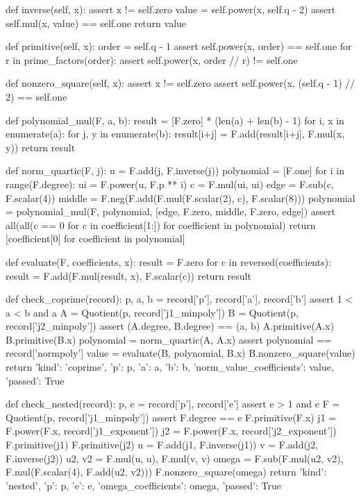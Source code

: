 \documentclass[11pt,a4paper]{article}
\begin{document}
\begin{CompleteProgram}
    def inverse(self, x):
        assert x != self.zero
        value = self.power(x, self.q - 2)
        assert self.mul(x, value) == self.one
        return value

    def primitive(self, x):
        order = self.q - 1
        assert self.power(x, order) == self.one
        for r in prime_factors(order):
            assert self.power(x, order // r) != self.one

    def nonzero_square(self, x):
        assert x != self.zero
        assert self.power(x, (self.q - 1) // 2) == self.one


def polynomial_mul(F, a, b):
    result = [F.zero] * (len(a) + len(b) - 1)
    for i, x in enumerate(a):
        for j, y in enumerate(b):
            result[i+j] = F.add(result[i+j], F.mul(x, y))
    return result


def norm_quartic(F, j):
    u = F.add(j, F.inverse(j))
    polynomial = [F.one]
    for i in range(F.degree):
        ui = F.power(u, F.p ** i)
        c = F.mul(ui, ui)
        edge = F.sub(c, F.scalar(4))
        middle = F.neg(F.add(F.mul(F.scalar(2), c), F.scalar(8)))
        polynomial = polynomial_mul(F, polynomial,
                                    [edge, F.zero, middle, F.zero, edge])
    assert all(all(c == 0 for c in coefficient[1:]) for coefficient in polynomial)
    return [coefficient[0] for coefficient in polynomial]


def evaluate(F, coefficients, x):
    result = F.zero
    for c in reversed(coefficients):
        result = F.add(F.mul(result, x), F.scalar(c))
    return result


def check_coprime(record):
    p, a, b = record['p'], record['a'], record['b']
    assert 1 < a < b and a %
    A = Quotient(p, record['j1_minpoly'])
    B = Quotient(p, record['j2_minpoly'])
    assert (A.degree, B.degree) == (a, b)
    A.primitive(A.x)
    B.primitive(B.x)
    polynomial = norm_quartic(A, A.x)
    assert polynomial == record['normpoly']
    value = evaluate(B, polynomial, B.x)
    B.nonzero_square(value)
    return {'kind': 'coprime', 'p': p, 'a': a, 'b': b,
            'norm_value_coefficients': value, 'passed': True}


def check_nested(record):
    p, e = record['p'], record['e']
    assert e > 1 and e %
    F = Quotient(p, record['j1_minpoly'])
    assert F.degree == e
    F.primitive(F.x)
    j1 = F.power(F.x, record['j1_exponent'])
    j2 = F.power(F.x, record['j2_exponent'])
    F.primitive(j1)
    F.primitive(j2)
    u = F.add(j1, F.inverse(j1))
    v = F.add(j2, F.inverse(j2))
    u2, v2 = F.mul(u, u), F.mul(v, v)
    omega = F.sub(F.mul(u2, v2), F.mul(F.scalar(4), F.add(u2, v2)))
    F.nonzero_square(omega)
    return {'kind': 'nested', 'p': p, 'e': e,
            'omega_coefficients': omega, 'passed': True}



\end{CompleteProgram}
\end{document}
